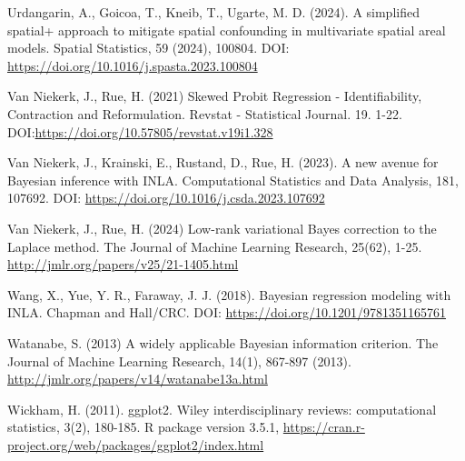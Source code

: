 \documentclass{article}
\begin{document}
\begin{thebibliography}{99}
Urdangarin, A., Goicoa, T., Kneib, T., Ugarte, M. D. (2024). A simplified spatial+ approach to mitigate spatial confounding in multivariate spatial areal models. Spatial Statistics, 59 (2024), 100804. DOI: \url{https://doi.org/10.1016/j.spasta.2023.100804}

Van Niekerk, J., Rue, H. (2021) Skewed Probit Regression - Identifiability, Contraction and Reformulation. Revstat - Statistical Journal. 19. 1-22. DOI:\url{https://doi.org/10.57805/revstat.v19i1.328}

Van Niekerk, J., Krainski, E., Rustand, D., Rue, H. (2023). A new avenue for Bayesian inference with INLA. Computational Statistics and Data Analysis, 181, 107692. DOI: \url{https://doi.org/10.1016/j.csda.2023.107692}

Van Niekerk, J.,  Rue, H. (2024) Low-rank variational Bayes correction to the Laplace method. The Journal of Machine Learning Research, 25(62), 1-25. \url{http://jmlr.org/papers/v25/21-1405.html}

Wang, X., Yue, Y. R., Faraway, J. J. (2018). Bayesian regression modeling with INLA. Chapman and Hall/CRC. DOI: \url{https://doi.org/10.1201/9781351165761}

Watanabe, S. (2013) A widely applicable Bayesian information criterion. The Journal of Machine Learning Research, 14(1), 867-897 (2013). \url{http://jmlr.org/papers/v14/watanabe13a.html}

Wickham, H. (2011). ggplot2. Wiley interdisciplinary reviews: computational statistics, 3(2), 180-185. R package version 3.5.1, \url{https://cran.r-project.org/web/packages/ggplot2/index.html}



\end{thebibliography}
\end{document}
